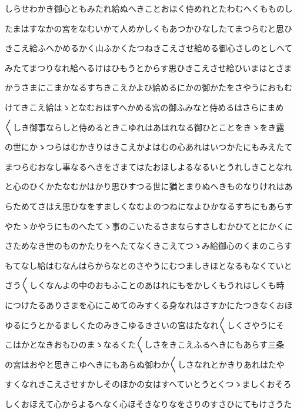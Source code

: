 \documentclass[a4paper,11pt,landscape]{ltjtarticle}
\begin{document}
\par\medskip
しらせわかき御心ともみたれ給ぬへきことおほく侍めれとたわむへくもものし
\par\medskip
たまはすなかの宮をなむいかて人めかしくもあつかひなしたてまつらむと思ひ
\par\medskip
きこえ給ふへかめるかく山ふかくたつねきこえさせ給める御心さしのとしへて
\par\medskip
みたてまつりなれ給へるけはひもうとからす思ひきこえさせ給ひいまはとさま
\par\medskip
かうさまにこまかなるすちきこえかよひ給めるにかの御かたをさやうにおもむ
\par\medskip
けてきこえ給はゝとなむおほすへかめる宮の御ふみなと侍めるはさらにまめ
\par\medskip
〱しき御事ならしと侍めるときこゆれはあはれなる御ひとことをきゝをき露
\par\medskip
の世にかゝつらはむかきりはきこえかよはむの心あれはいつかたにもみえたて
\par\medskip
まつらむおなし事なるへきをさまてはたおほしよるなるいとうれしきことなれ
\par\medskip
と心のひくかたなむかはかり思ひすつる世に猶とまりぬへきものなりけれはあ
\par\medskip
らためてさはえ思ひなをすましくなむよのつねになよひかなるすちにもあらす
\par\medskip
やたゝかやうにものへたてゝ事のこいたるさまならすさしむかひてとにかくに
\par\medskip
さためなき世のものかたりをへたてなくきこえてつゝみ給御心のくまのこらす
\par\medskip
もてなし給はむなんはらからなとのさやうにむつましきほとなるもなくていと
\par\medskip
さう〱しくなんよの中のおもふことのあはれにもをかしくもうれはしくも時
\par\medskip
につけたるありさまを心にこめてのみすくる身なれはさすかにたつきなくおほ
\par\medskip
ゆるにうとかるましくたのみきこゆるきさいの宮はたなれ〱しくさやうにそ
\par\medskip
こはかとなきおもひのまゝなるくた〱しさをきこえふるへきにもあらす三条
\par\medskip
の宮はおやと思きこゆへきにもあらぬ御わか〱しさなれとかきりあれはたや
\par\medskip
すくなれきこえさせすかしそのほかの女はすへていとうとくつゝましくおそろ
\par\medskip
しくおほえて心からよるへなく心ほそきなりなをさりのすさひにてもけさうた
\par\medskip
\end{document}
